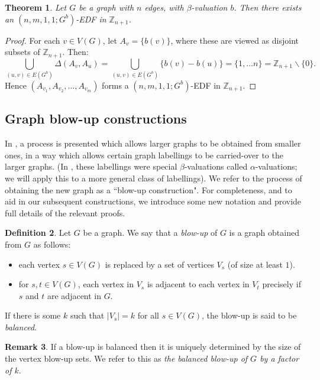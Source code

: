 \documentclass[12pt, a4paper]{article}
\newtheorem{theorem}{Theorem}[section]
\theoremstyle{definition}
\newtheorem{definition}[theorem]{Definition}
\newtheorem{remark}[theorem]{Remark}
\begin{document}
\begin{theorem}
    Let $G$ be a graph with $n$ edges, with $\beta$-valuation $b$.  Then there exists an $(n,m,1,1;G^b)$-EDF in $\mathbb{Z}_{n+1}$.
\end{theorem}
\begin{proof}
For each $v \in V(G)$, let $A_v=\{b(v)\}$, where these are viewed as disjoint subsets of $\mathbb{Z}_{n+1}$. Then:
\[\bigcup_{(u,v)\in E(G^b)} \Delta(A_v,A_u)= \bigcup_{(u,v)\in E(G^b)} \{b(v)-b(u)\}=\{1, \ldots n\}=\mathbb{Z}_{n+1}\backslash\{0\}.\]
Hence $(A_{v_1},A_{v_2},\ldots,A_{v_{m}})$ forms a $(n,m,1,1;G^b)$-EDF in $\mathbb{Z}_{n+1}$.
\end{proof}


\subsection{Graph blow-up constructions}

In \cite{PatStiCEDF}, a process is presented which allows larger graphs to be obtained from smaller ones, in a way which allows certain graph labellings to be carried-over to the larger graphs. (In \cite{PatStiCEDF}, these labellings were special $\beta$-valuations called $\alpha$-valuations; we will apply this to a more general class of labellings).  We refer to the process of obtaining the new graph as a ``blow-up construction".  For completeness, and to aid in our subsequent constructions, we introduce some new notation and provide full details of the relevant proofs.

\begin{definition}
Let $G$ be a graph. We say that a \emph{blow-up} of $G$ is a graph obtained from $G$ as follows: 
\begin{itemize}
\item each vertex $s \in V(G)$ is replaced by a set of vertices $V_s$ (of size at least $1$).
\item for $s,t \in V(G)$, each vertex in $V_s$ is adjacent to each vertex in $V_t$ precisely if $s$ and $t$ are adjacent in $G$.
\end{itemize}
If there is some $k$ such that $|V_s|=k$ for all $s \in V(G)$, the blow-up is said to be \emph{balanced}. 
\end{definition}

\begin{remark}
If a blow-up is balanced then it is uniquely determined by the size of the vertex blow-up sets.   We refer to this as \emph{the balanced blow-up of $G$ by a factor of $k$}. 
\end{remark}
\end{document}

